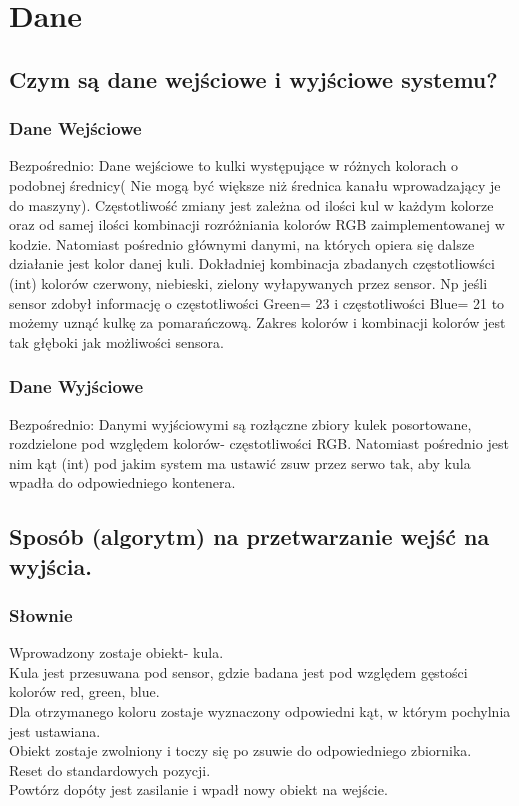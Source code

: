 \documentclass[12pt]{article}
\begin{document}
\section{Dane}
\subsection{Czym są dane wejściowe i wyjściowe systemu?}
\subsubsection{Dane Wejściowe}
Bezpośrednio: Dane wejściowe to kulki występujące w różnych kolorach o podobnej średnicy( Nie mogą być większe niż średnica kanału wprowadzający je do maszyny). Częstotliwość zmiany jest zależna od ilości kul w każdym kolorze oraz od samej ilości kombinacji rozróżniania kolorów RGB zaimplementowanej w kodzie. Natomiast pośrednio głównymi danymi, na których opiera się dalsze działanie jest kolor danej kuli. Dokładniej kombinacja zbadanych częstotliowści (int) kolorów czerwony, niebieski, zielony wyłapywanych przez sensor. Np jeśli sensor zdobył informację o częstotliwości Green= 23  i częstotliwości Blue= 21 to możemy uznąć kulkę za pomarańczową. Zakres kolorów i kombinacji kolorów jest tak głęboki jak możliwości sensora.
\subsubsection{Dane Wyjściowe}
Bezpośrednio: Danymi wyjściowymi są rozłączne zbiory kulek posortowane, rozdzielone pod względem kolorów- częstotliwości RGB. Natomiast pośrednio jest nim kąt (int) pod jakim system ma ustawić zsuw przez serwo tak, aby kula wpadła do odpowiedniego kontenera.
\subsection{Sposób (algorytm) na przetwarzanie wejść na wyjścia.}
\subsubsection{Słownie}
Wprowadzony zostaje obiekt- kula.\\
Kula jest przesuwana pod sensor, gdzie badana jest pod względem gęstości kolorów red, green, blue.\\
Dla otrzymanego koloru zostaje wyznaczony odpowiedni kąt, w którym pochylnia jest ustawiana.\\
Obiekt zostaje zwolniony i toczy się po zsuwie do odpowiedniego zbiornika.\\
Reset do standardowych pozycji.\\
Powtórz dopóty jest zasilanie i wpadł nowy obiekt na wejście.\\
\end{document}
